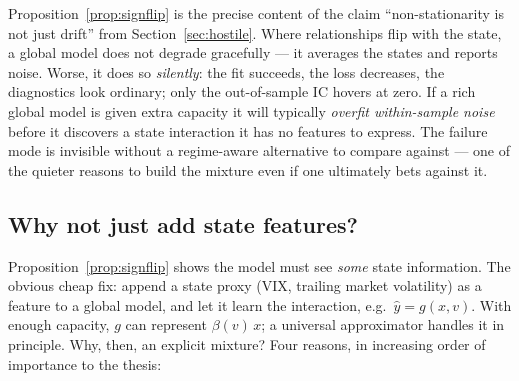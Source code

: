 \begin{whatbreaks}
Proposition~\ref{prop:signflip} is the precise content of the claim
``non-stationarity is not just drift'' from
Section~\ref{sec:hostile}. Where relationships flip with the state, a global
model does not degrade gracefully --- it averages the states and reports
noise. Worse, it does so \emph{silently}: the fit succeeds, the loss
decreases, the diagnostics look ordinary; only the out-of-sample IC hovers
at zero. If a rich global model is given extra capacity it will typically
\emph{overfit within-sample noise} before it discovers a state interaction
it has no features to express. The failure mode is invisible without a
regime-aware alternative to compare against --- one of the quieter reasons
to build the mixture even if one ultimately bets against it.
\end{whatbreaks}

\subsection{Why not just add state features?}\label{sec:whynotfeatures}

Proposition~\ref{prop:signflip} shows the model must see \emph{some} state
information. The obvious cheap fix: append a state proxy (VIX, trailing
market volatility) as a feature to a global model, and let it learn the
interaction, e.g.\ $\hat y = g(x, v)$. With enough capacity, $g$ can
represent $\beta(v)\,x$; a universal approximator handles it in principle.
Why, then, an explicit mixture? Four reasons, in increasing order of
importance to the thesis:

